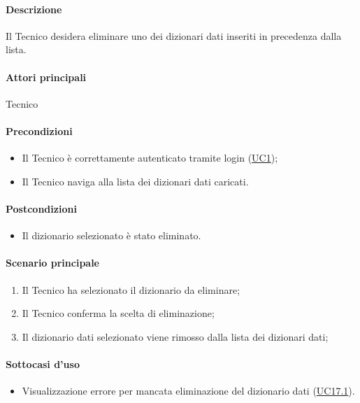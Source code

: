 \paragraph*{Descrizione} Il Tecnico desidera eliminare uno dei dizionari dati inseriti in precedenza dalla lista.

\paragraph*{Attori principali} Tecnico

\paragraph*{Precondizioni}
\begin{itemize}
  \item Il Tecnico è correttamente autenticato tramite login (\hyperref[UC1]{UC1});
  \item Il Tecnico naviga alla lista dei dizionari dati caricati.  
\end{itemize}

\paragraph*{Postcondizioni}
\begin{itemize}
  \item Il dizionario selezionato è stato eliminato.
\end{itemize}

\paragraph*{Scenario principale}
\begin{enumerate}
  \item Il Tecnico ha selezionato il dizionario da eliminare;
  \item Il Tecnico conferma la scelta di eliminazione;
  \item Il dizionario dati selezionato viene rimosso dalla lista dei dizionari dati;  
\end{enumerate}

\paragraph*{Sottocasi d'uso}
\begin{itemize}
  \item Visualizzazione errore per mancata eliminazione del dizionario dati (\hyperref[UC17point1]{UC17.1}).
\end{itemize}


